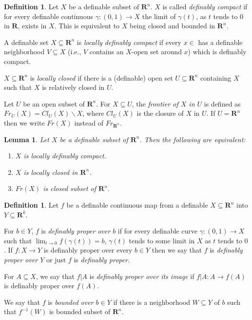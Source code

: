 \documentclass{amsart}
\newtheorem{lemma}[theorem]{Lemma}
\theoremstyle{definition}
\newtheorem{definition}[theorem]{Definition}
\numberwithin{equation}{section}
\begin{document}
\begin{definition}
  Let $X$ be a definable subset of $\mathbf{R}^n$.
  $X$ is called \emph{definably compact} if for every definable continuous $\gamma:(0,1) \to X$ the limit of $\gamma(t)$,
  as $t$ tends to $0$ in $\mathbf{R}$, exists in $X$.
  This is equivalent to $X$ being closed and bounded in $\mathbf{R}^n$.

  A definable set $X \subseteq \mathbf{R}^n$ is \emph{locally definably compact}
  if every $x \in $ has a definable neighborhood $V\subseteq X$
  (i.e., $V$ contains an $X$-open set around $x$)
  which is definably compact.

  $X \subseteq \mathbf{R}^n$ is \emph{locally closed} if there is a (definable) open set $U \subseteq \mathbf{R}^n$ containing $X$
  such that $X$ is relatively closed in $U$.

  Let $U$ be an open subset of $\mathbf{R}^n$.
  For $X \subseteq U$,
  the \emph{frontier of $X$ in $U$} is defined as $Fr_U(X) = Cl_U(X)\backslash X$,
  where $Cl_U(X)$ is the closure of $X$ in $U$.
  If $U = \mathbf{R}^n$ then we write $Fr(X)$ instead of $Fr_{\mathbf{R}^n}$.
\end{definition}

\begin{lemma}
  Let $X$ be a definable subset of $\mathbf{R}^n$.
  Then the following are equivalent:
  \begin{enumerate}[label = {(\roman*)}]
    \item $X$ is locally definably compact.
    \item $X$ is locally closed in $\mathbf{R}^n$.
    \item $Fr(X)$ is closed subset of $\mathbf{R}^n$.
  \end{enumerate}
\end{lemma}

\begin{definition}
  Let $f$ be a definable continuous map from a definable $X \subseteq \mathbf{R}^n$ into $Y \subseteq \mathbf{R}^k$.

  For $b \in Y$, $f$ is \emph{definably proper over $b$} if for every definable curve $\gamma:(0,1) \to X$ such that $\lim_{t\to 0} f(\gamma(t)) = b$,
  $\gamma(t)$ tends to some limit in $X$ as $t$ tends to $0$.
  If $f: X \to Y$ is definably proper over every $b\in Y$ then
  we say that $f$ is \emph{definably proper over $Y$} or just
  $f$ is \emph{definably proper}.

  For $A \subseteq X$, we say that $f|A$ is \emph{definably proper over its image} if $f|A : A \to f(A)$ is definably proper over $f(A)$.

  We say that $f$ is \emph{bounded over $b\in Y$} if there is a neighborhood $W \subseteq Y$ of $b$ such that $f^{-1}(W)$ is bounded subset of $\mathbf{R}^n$.
\end{definition}
\end{document}
